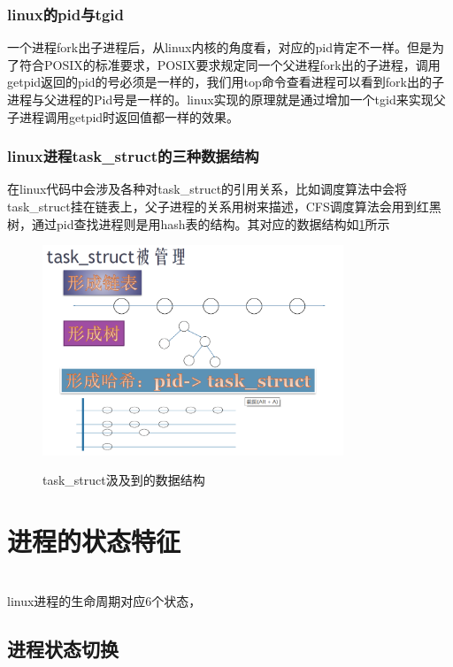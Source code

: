 \subsection{linux的pid与tgid}
一个进程fork出子进程后，从linux内核的角度看，对应的pid肯定不一样。但是为了符合POSIX的标准要求，POSIX要求规定同一个父进程fork出的子进程，调用getpid返回的pid的号必须是一样的，我们用top命令查看进程可以看到fork出的子进程与父进程的Pid号是一样的。linux实现的原理就是通过增加一个tgid来实现父子进程调用getpid时返回值都一样的效果。
\begin{tcolorbox}[colback=blue!5,colframe=blue!75!black,title=pid和tgid 视频]
\end{tcolorbox}

\subsection{linux进程task\_struct的三种数据结构}
在linux代码中会涉及各种对task\_struct的引用关系，比如调度算法中会将task\_struct挂在链表上，父子进程的关系用树来描述，CFS调度算法会用到红黑树，通过pid查找进程则是用hash表的结构。其对应的数据结构如\ref{task_datastructure}所示

\begin{figure}[H]
 \wdfigbox
  {\caption{task\_struct汲及到的数据结构}\label{task_datastructure}}
  {
  \includegraphics[width=9cm]{./figure/task_datastructure.png}
  }
\end{figure}
\chapter{进程的状态特征}
~\\linux进程的生命周期对应6个状态，
\section{进程状态切换}
